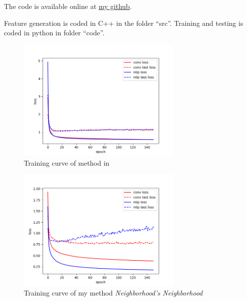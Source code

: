 \documentclass{article}
\begin{document}
The code is available online at \href{https://github.com/flm8620/nuage_de_points/tree/master/projet}{my github}.

Feature generation is coded in C++ in the folder ``src''. Training and testing is coded in python in folder ``code''.

\begin{figure}[h]
	\centering
	\includegraphics[width=8cm]{Figure_timo.png}
	\caption{Training curve of method in \cite{hackel2016fast}}
	\label{fig:timo_curve}
\end{figure}

\begin{figure}[h]
	\centering
	\includegraphics[width=8cm]{Figure_leman.png}
	\caption{Training curve of my method \textit{Neighborhood's Neighborhood}}
	\label{fig:leman_curve}
\end{figure}
\end{document}
